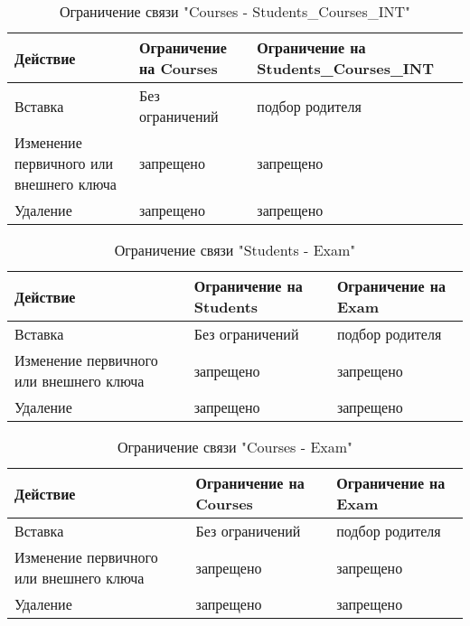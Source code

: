 \documentclass[a4paper, 14pt]{extarticle}
\begin{document}
\begin{table}[H]
\centering
\captionsetup{singlelinecheck=false, justification=raggedright}
\caption{Ограничение связи "Courses - Students\_Courses\_INT"}
    \begin{tabular}
        {|p{4cm}|p{5cm}|p{5cm}|}
        \hline
        Действие & Ограничение на Courses & Ограничение на Students\_Courses\_INT \\
        \hline
        Вставка &  Без ограничений & подбор родителя \\
        \hline
        Изменение первичного или внешнего ключа & запрещено & запрещено \\
        \hline
        Удаление & запрещено & запрещено \\
    \hline
    \end{tabular}
\end{table}

\begin{table}[H]
\centering
\captionsetup{singlelinecheck=false, justification=raggedright}
\caption{Ограничение связи "Students - Exam"}
    \begin{tabular}
        {|p{4cm}|p{5cm}|p{5cm}|}
        \hline
        Действие & Ограничение на Students & Ограничение на Exam \\
        \hline
        Вставка &  Без ограничений & подбор родителя \\
        \hline
        Изменение первичного или внешнего ключа & запрещено & запрещено \\
        \hline
        Удаление & запрещено & запрещено \\
    \hline
    \end{tabular}
\end{table}

\begin{table}[H]
\centering
\captionsetup{singlelinecheck=false, justification=raggedright}
\caption{Ограничение связи "Courses - Exam"}
    \begin{tabular}
        {|p{4cm}|p{5cm}|p{5cm}|}
        \hline
        Действие & Ограничение на Courses & Ограничение на Exam \\
        \hline
        Вставка & Без ограничений & подбор родителя \\
        \hline
        Изменение первичного или внешнего ключа & запрещено & запрещено \\
        \hline
        Удаление & запрещено & запрещено \\
    \hline
    \end{tabular}
\end{table}
\end{document}
